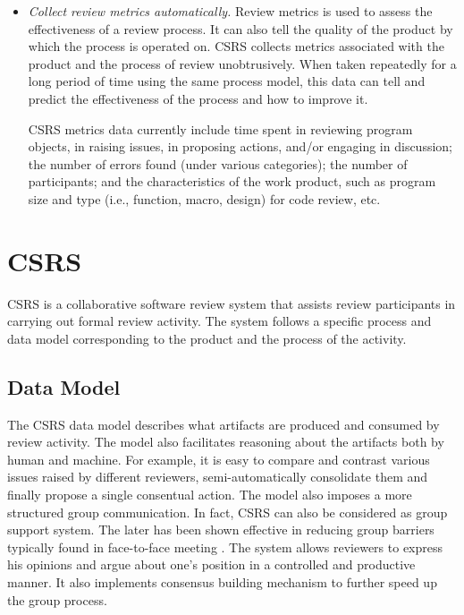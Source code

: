\begin {itemize}
\item {\sl Collect review metrics automatically.}
Review metrics is used to assess the effectiveness of a review
process. It can also tell the quality of the product by
which the process is operated on.
CSRS collects metrics associated with the product and the process of
review unobtrusively.  When taken repeatedly for a long period of
time using the same process model, this data can tell and predict the
effectiveness of the process and how to improve it.

CSRS metrics data currently include
time spent in reviewing program objects, in
raising issues, in proposing actions, and/or engaging in 
discussion; the number of errors found (under various categories); the
number of participants; and the characteristics of
the work product, such as program size and type (i.e., function, macro,
design) for code review, etc.

\end{itemize}

\section {CSRS}

CSRS is a collaborative software review system that assists review
participants in carrying out formal review activity. The system
follows a specific process and data model corresponding to the product
and the process of the activity.

\subsection {Data Model}
The CSRS data model describes what artifacts are produced and
consumed by review activity. 
The  model also facilitates reasoning about the artifacts both by
human and machine.  For example, it is easy to compare and contrast
various issues raised by different reviewers, semi-automatically
consolidate them and finally propose a single consentual action.
The model also imposes a more structured group communication. In fact,
CSRS can also be considered as group support system. The later
has been shown effective in reducing group barriers
typically found in face-to-face meeting \cite{Nunamaker91}.  The system allows
reviewers to express his opinions and argue about one's position in a
controlled and productive manner. It also implements
consensus building mechanism to further speed up the group process.

